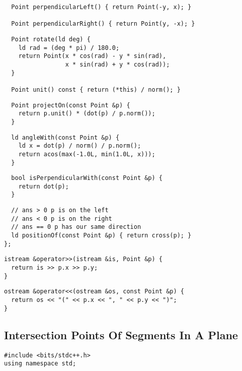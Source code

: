 \documentclass[twoside]{article}
\begin{document}
\begin{multicols*}{2}
\begin{verbatim}
  Point perpendicularLeft() { return Point(-y, x); }

  Point perpendicularRight() { return Point(y, -x); }
\end{verbatim}
\vspace{-12pt}
\begin{verbatim}
  Point rotate(ld deg) {
    ld rad = (deg * pi) / 180.0;
    return Point(x * cos(rad) - y * sin(rad),
                 x * sin(rad) + y * cos(rad));
  }

  Point unit() const { return (*this) / norm(); }
  \end{verbatim}
\vspace{-12pt}
\begin{verbatim}
  Point projectOn(const Point &p) {
    return p.unit() * (dot(p) / p.norm());
  }
\end{verbatim}
\vspace{-12pt}
\begin{verbatim}
  ld angleWith(const Point &p) {
    ld x = dot(p) / norm() / p.norm();
    return acos(max(-1.0L, min(1.0L, x)));
  }
\end{verbatim}
\vspace{-12pt}
\begin{verbatim}
  bool isPerpendicularWith(const Point &p) {
    return dot(p);
  }
\end{verbatim}
\vspace{-12pt}
\begin{verbatim}
  // ans > 0 p is on the left
  // ans < 0 p is on the right
  // ans == 0 p has our same direction
  ld positionOf(const Point &p) { return cross(p); }
};
\end{verbatim}
\vspace{-12pt}
\begin{verbatim}
istream &operator>>(istream &is, Point &p) {
  return is >> p.x >> p.y;
}
\end{verbatim}
\vspace{-12pt}
\begin{verbatim}
ostream &operator<<(ostream &os, const Point &p) {
  return os << "(" << p.x << ", " << p.y << ")";
}
\end{verbatim}

\subsectionfont{\large\bfseries\sffamily\underline}
\subsection*{Intersection Points Of Segments In A Plane}
\begin{verbatim}
#include <bits/stdc++.h>
using namespace std;


\end{verbatim}
\end{multicols*}
\end{document}
